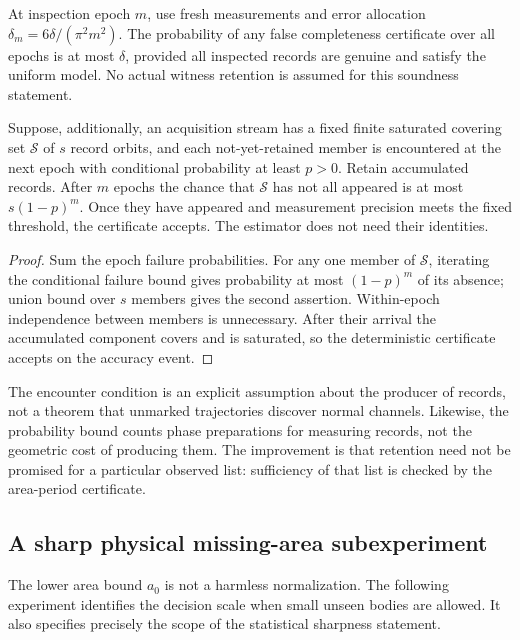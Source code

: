 \begin{corollary}\label{cor:sequential}
At inspection epoch $m$, use fresh measurements and error allocation
$\delta_m=6\delta/(\pi^2m^2)$. The probability of any false completeness
certificate over all epochs is at most $\delta$, provided all inspected
records are genuine and satisfy the uniform model. No actual witness
retention is assumed for this soundness statement.

Suppose, additionally, an acquisition stream has a fixed finite saturated
covering set $\mathcal S$ of $s$ record orbits, and each not-yet-retained
member is encountered at the next epoch with conditional probability
at least $p>0$. Retain accumulated records. After $m$ epochs the chance
that $\mathcal S$ has not all appeared is at most $s(1-p)^m$.
Once they have appeared and measurement precision meets the fixed threshold,
the certificate accepts. The estimator does not need their identities.
\end{corollary}
\begin{proof}
Sum the epoch failure probabilities. For any one member of $\mathcal S$,
iterating the conditional failure bound gives probability at most
$(1-p)^m$ of its absence; union bound over $s$ members gives the second
assertion. Within-epoch independence between members is unnecessary.
After their arrival the accumulated component covers and is saturated,
so the deterministic certificate accepts on the accuracy event.
\end{proof}

The encounter condition is an explicit assumption about the producer of
records, not a theorem that unmarked trajectories discover normal channels.
Likewise, the probability bound counts phase preparations for measuring
records, not the geometric cost of producing them. The improvement is
that retention need not be promised for a particular observed list:
sufficiency of that list is checked by the area-period certificate.

\subsection{A sharp physical missing-area subexperiment}
The lower area bound $a_0$ is not a harmless normalization. The following
experiment identifies the decision scale when small unseen bodies are
allowed. It also specifies precisely the scope of the statistical
sharpness statement.

